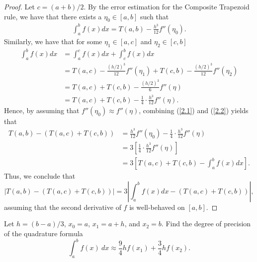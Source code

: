 \documentclass[8pt]{article}
\theoremstyle{definition}
\newenvironment{exercise}[1]
  {\renewcommand\theinnerexercise{#1}\innerexercise}
  {\endinnerexercise}
\begin{document}
\begin{proof}
Let $c = (a + b)/2$. By the error estimation for the Composite Trapezoid rule, we have that there exists a $\eta_0 \in [a, b]$ such that 
\begin{align}
\int_{a}^{b} f(x) dx = T(a, b) - \frac{h^3}{12} f''(\eta_0). \label{2.1}
\end{align}
Similarly, we have that for some $\eta_1 \in [a, c]$ and $\eta_2 \in [c, b]$
\begin{align}
\nonumber \int_{a}^{b} f(x) dx &= \int_{a}^{c} f(x) dx + \int_{c}^{b} f(x) dx \\
\nonumber &= T(a, c) - \frac{(h/2)^3}{12} f''(\eta_1) + T(c, b) - \frac{(h/2)^3}{12} f''(\eta_2) \\
&= T(a, c) + T(c, b) - \frac{(h/2)^3}{6} f''(\eta) \ \ \ \ \ \tag{exists $\eta \in (\eta_1, \eta_2)$ by I.V.T.} \\
&= T(a, c) + T(c, b) - \frac{1}{4} \cdot \frac{h^3}{12} f''(\eta). \label{2.2}
\end{align}
Hence, by assuming that $f''(\eta_0) \approx f''(\eta)$, combining (\ref{2.1}) and (\ref{2.2}) yields that
\begin{align}
\nonumber T(a, b) - (T(a, c) + T(c, b)) &= \frac{h^3}{12} f''(\eta_0) - \frac{1}{4} \cdot \frac{h^3}{12} f''(\eta) \\
\nonumber &= 3 \left[ \frac{1}{4} \cdot \frac{h^3}{12} f''(\eta) \right] \\
\nonumber &= 3 \left[ T(a,c) + T(c, b) - \int_{a}^{b} f(x) dx \right].
\end{align}
Thus, we conclude that $$\left| T(a, b) - (T(a, c) + T(c, b)) \right| = 3 \left| \int_{a}^{b} f(x) dx - (T(a,c) + T(c, b)) \right|,$$ assuming that the second derivative of $f$ is well-behaved on $[a, b]$.
\end{proof}





\begin{exercise}{3}
Let $h = (b - a)/3$, $x_0 = a$, $x_1 = a + h$, and $x_2 = b$. Find the degree of precision of the quadrature formula $$\int_{a}^{b} f(x) \ dx \approx \frac{9}{4} h f(x_1) + \frac{3}{4} h f(x_2).$$
\end{exercise}
\end{document}
